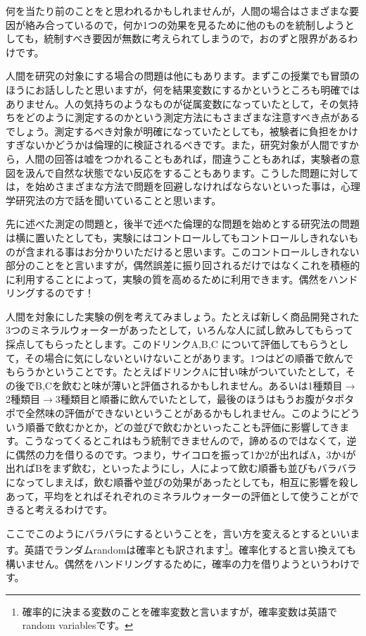 \documentclass{ltjbook}
\begin{document}
何を当たり前のことをと思われるかもしれませんが，人間の場合はさまざまな要因が絡み合っているので，何か1つの効果を見るために他のものを統制しようとしても，統制すべき要因が無数に考えられてしまうので，おのずと限界があるわけです。

人間を研究の対象にする場合の問題は他にもあります。まずこの授業でも冒頭のほうにお話ししたと思いますが，何を結果変数にするかというところも明確ではありません。人の気持ちのようなものが従属変数になっていたとして，その気持ちをどのように測定するのかという測定方法にもさまざまな注意すべき点があるでしょう。測定するべき対象が明確になっていたとしても，被験者に負担をかけすぎないかどうかは倫理的に検証されるべきです。また，研究対象が人間ですから，人間の回答は嘘をつかれることもあれば，間違うこともあれば，実験者の意図を汲んで自然な状態でない反応をすることもあります。こうした問題に対しては，を始めさまざまな方法で問題を回避しなければならないといった事は，心理学研究法の方で話を聞いていることと思います。

先に述べた測定の問題と，後半で述べた倫理的な問題を始めとする研究法の問題は横に置いたとしても，実験にはコントロールしてもコントロールしきれないものが含まれる事はお分かりいただけると思います。このコントロールしきれない部分のことをと言いますが，偶然誤差に振り回されるだけではなくこれを積極的に利用することによって，実験の質を高めるために利用できます。偶然をハンドリングするのです！

人間を対象にした実験の例を考えてみましょう。たとえば新しく商品開発された3つのミネラルウォーターがあったとして，いろんな人に試し飲みしてもらって採点してもらったとします。このドリンクA,B,C について評価してもらうとして，その場合に気にしないといけないことがあります。1つはどの順番で飲んでもらうかということです。たとえばドリンクAに甘い味がついていたとして，その後でB,Cを飲むと味が薄いと評価されるかもしれません。あるいは1種類目$\to$2種類目$\to$3種類目と順番に飲んでいたとして，最後のほうはもうお腹がタポタポで全然味の評価ができないということがあるかもしれません。このようにどういう順番で飲むかとか，どの並びで飲むかといったことも評価に影響してきます。こうなってくるとこれはもう統制できませんので，諦めるのではなくて，逆に偶然の力を借りるのです。つまり，サイコロを振って1か2が出ればA，3か4が出ればBをまず飲む，といったようにし，人によって飲む順番も並びもバラバラになってしまえば，飲む順番や並びの効果があったとしても，相互に影響を殺しあって，平均をとればそれぞれのミネラルウォーターの評価として使うことができると考えるわけです。

ここでこのようにバラバラにするということを，言い方を変えるとするといいます。英語でランダムrandomは確率とも訳されます\footnote{確率的に決まる変数のことを確率変数と言いますが，確率変数は英語でrandom variablesです。}。確率化すると言い換えても構いません。偶然をハンドリングするために，確率の力を借りようというわけです。
\end{document}

